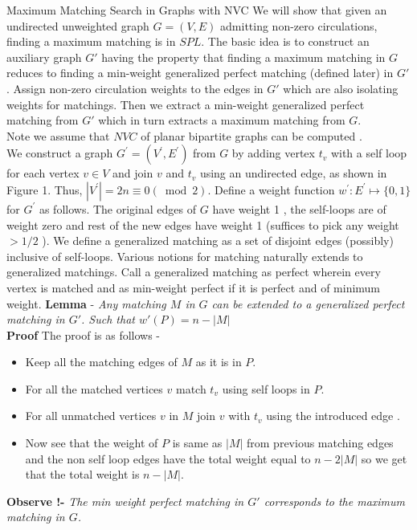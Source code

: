 \documentclass{beamer}
\begin{document}
\begin{frame}[allowframebreaks]{Maximum Matching Search in Graphs with NVC}
	\break
	We will show that given an undirected unweighted graph $G = (V, E)$ admitting
	non-zero circulations, finding a maximum matching is in $SPL$. The basic idea is to construct
	an auxiliary graph $G'$ having the property that finding a maximum matching in $G$ reduces
	to finding a min-weight generalized perfect matching (defined later) in $G'$. Assign non-zero
	circulation weights to the edges in $G'$ which are also isolating weights for matchings. Then
	we extract a min-weight generalized perfect matching from $G'$ which in turn extracts a
	maximum matching from $G$.
	\\
	Note we assume that $NVC$ of planar bipartite graphs can be computed .
	\\
	We construct a graph $G^{\prime}=\left(V^{\prime}, E^{\prime}\right)$ from $G$ by adding vertex $t_v$ with a self loop for each vertex $v \in V$ and join $v$ and $t_v$ using an undirected edge, as shown in Figure 1. Thus, $\left|V^{\prime}\right|=2 n \equiv 0(\bmod 2)$.  Define a weight function $w^{\prime}: E^{\prime} \mapsto\{0,1\}$ for $G^{\prime}$ as follows. The original edges of $G$ have weight 1 , the self-loops are of weight zero and rest of the new edges have weight 1 (suffices to pick any weight $>1 / 2$ ). We define a generalized matching as a set of disjoint edges (possibly) inclusive of self-loops. Various notions for matching naturally extends to generalized matchings. Call a generalized matching as perfect wherein every vertex is matched and as min-weight perfect if it is perfect and of minimum weight.\break \break
	\textbf{Lemma} - \textit{Any matching  $M$ in $G$ can be extended to a generalized perfect matching in $G'$. Such that $w'(P)=n-|M|$}
	\\
	\textbf{Proof} The proof is as follows -
	\begin{itemize}
		\item Keep all the matching edges of $M$ as it  is in $P$.
		\item For all the matched  vertices $v$ match $t_v$ using self loops in $P$.
		\item For all unmatched vertices $v$ in $M$ join $v$ with $t_v$ using the introduced edge .
		\item Now see that the weight of $P$ is same as $|M|$ from previous matching edges and  the non self loop edges have the total weight equal to $n-2|M|$ so we get that the total weight is $n-|M|$.
	\end{itemize}\break
   \textbf{Observe !-} \textit{The min weight perfect matching in $G'$ corresponds to the maximum matching in $G$.}\break
   

\end{frame}
\end{document}

